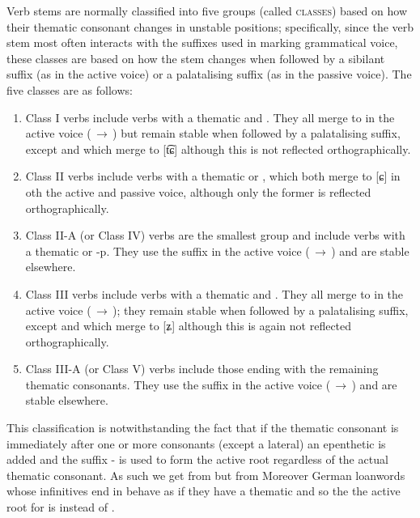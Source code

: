 Verb stems are normally classified into five groups (called {\scshape classes})
based on how their thematic consonant changes in unstable positions;
specifically, since the verb stem most often interacts with the suffixes used in
marking grammatical voice, these classes are based on how the stem changes when
followed by a sibilant suffix (as in the active voice) or a palatalising suffix
(as in the passive voice). The five classes are as follows: 
\begin{enumerate}[nosep]
	\item Class I verbs include verbs with a thematic  and
	. They all merge to  in the active voice
	(\,$\rightarrow$\,) but remain stable
	when followed by a palatalising suffix, except  and 
	which merge to [t͡ɕ] although this is not reflected orthographically.
	\item Class II verbs include verbs with a thematic  or ,
	which both merge to [ɕ] in oth the active and passive voice, although only
	the former is reflected orthographically. 
	\item Class II-A (or Class IV) verbs are the smallest group and include
	verbs with a thematic  or {-p}. They use the suffix  in
	the active voice (\,$\rightarrow$\,) and are stable
	elsewhere.
	\item Class III verbs include verbs with a thematic 
	and . They all merge to  in the active voice
	(\,$\rightarrow$\,); they remain stable when
	followed by a palatalising suffix, except  and  which
	merge to [ʑ] although this is again not reflected orthographically.
	\item Class III-A (or Class V) verbs include those ending with the remaining
	thematic consonants. They use the suffix  in the active voice
	(\,$\rightarrow$\,) and are
	stable elsewhere.
\end{enumerate}

This classification is notwithstanding the fact that if the thematic consonant
is immediately after one or more consonants (except a lateral) an epenthetic
 is added and the suffix - is used to form the active root
regardless of the actual thematic consonant. As such we get 
from  but  from  Moreover German loanwords whose infinitives end in  behave
as if they have a thematic  and so the the active root for
 is 
instead of .

